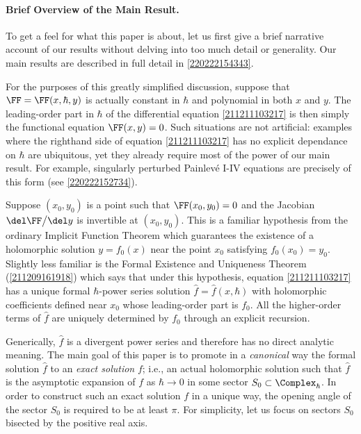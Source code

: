 \documentclass[11pt]{article}
\begin{document}
\enlargethispage{10pt}
\paragraph{Brief Overview of the Main Result.}
To get a feel for what this paper is about, let us first give a brief narrative account of our results without delving into too much detail or generality.
Our main results are described in full detail in \autoref{220222154343}.

For the purposes of this greatly simplified discussion, suppose that $\FF = \FF (x, \hbar, y)$ is actually constant in $\hbar$ and polynomial in both $x$ and $y$.
The leading-order part in $\hbar$ of the differential equation \eqref{211211103217} is then simply the functional equation $\FF (x, y) = 0$.
Such situations are not artificial: examples where the righthand side of equation \eqref{211211103217} has no explicit dependance on $\hbar$ are ubiquitous, yet they already require most of the power of our main result.
For example, singularly perturbed Painlevé I-IV equations are precisely of this form (see \autoref{220222152734}).

Suppose $(x_0, y_0)$ is a point such that $\FF (x_0, y_0) = 0$ and the Jacobian $\del \FF \big/ \del y$ is invertible at $(x_0, y_0)$.
This is a familiar hypothesis from the ordinary Implicit Function Theorem which guarantees the existence of a holomorphic solution $y = f_0 (x)$ near the point $x_0$ satisfying $f_0 (x_0) = y_0$.
Slightly less familiar is the Formal Existence and Uniqueness Theorem (\autoref{211209161918}) which says that under this hypothesis, equation \eqref{211211103217} has a unique formal $\hbar$-power series solution $\hat{f} = \hat{f} (x, \hbar)$ with holomorphic coefficients defined near $x_0$ whose leading-order part is $f_0$.
All the higher-order terms of $\hat{f}$ are uniquely determined by $f_0$ through an explicit recursion.

Generically, $\hat{f}$ is a divergent power series and therefore has no direct analytic meaning.
The main goal of this paper is to promote in a \textit{canonical} way the formal solution $\hat{f}$ to an \textit{exact solution} $f$; i.e., an actual holomorphic solution such that $\hat{f}$ is the asymptotic expansion of $f$ as $\hbar \to 0$ in some sector $S_0 \subset \Complex_\hbar$.
In order to construct such an exact solution $f$ in a unique way, the opening angle of the sector $S_0$ is required to be at least $\pi$.
For simplicity, let us focus on sectors $S_0$ bisected by the positive real axis.
\end{document}
